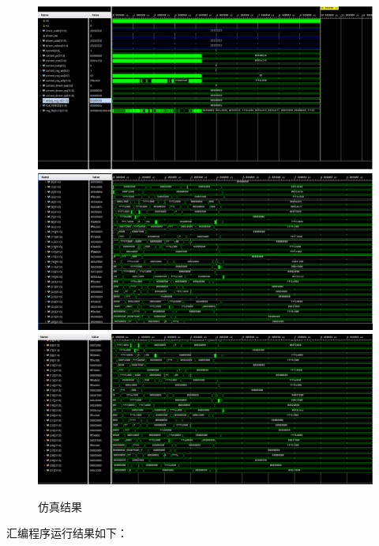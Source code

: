 \documentclass[12pt,a4paper]{ctexart}
\begin{document}
\begin{figure}[H]
    \centering
    \includegraphics[scale=0.3]{pic/1.png}
    \includegraphics[scale=0.3]{pic/2.png}
    \includegraphics[scale=0.3]{pic/3.png}
    \caption{仿真结果}
\end{figure}
汇编程序运行结果如下：
\end{document}
